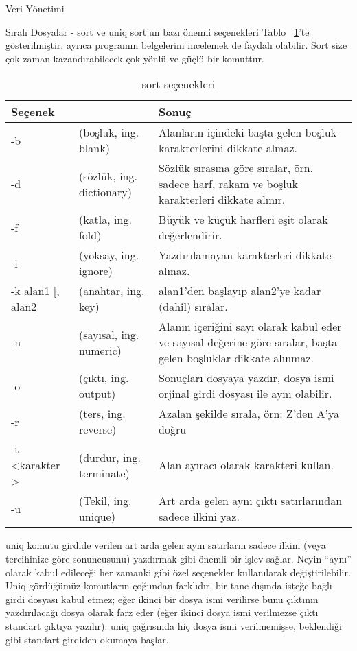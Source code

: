 \begin{section}{Veri Yönetimi}
\begin{subsection}{Sıralı Dosyalar - sort ve uniq}
sort'un bazı önemli seçenekleri Tablo ~\ref{tab:8.3}'te gösterilmiştir, ayrıca programın belgelerini incelemek de faydalı olabilir. Sort size çok zaman kazandırabilecek çok yönlü ve güçlü bir komuttur.

\footnotesize
\begin {table}[Htb]
\caption {sort seçenekleri} \label{tab:8.3}
\begin{tabular}{p{2cm} p{3cm} p{6cm}}
\hline
Seçenek & & Sonuç\\
\hline
-b & (boşluk, ing. blank) & Alanların içindeki başta gelen boşluk karakterlerini dikkate almaz.\\
-d & (sözlük, ing. dictionary) & Sözlük sırasına göre sıralar, örn. sadece harf, rakam ve boşluk karakterleri dikkate alınır.\\
-f & (katla, ing. fold) & Büyük ve küçük harfleri eşit olarak değerlendirir.\\
-i & (yoksay, ing. ignore) & Yazdırılamayan karakterleri dikkate almaz.\\
-k alan1 [, alan2] & (anahtar, ing. key) & alan1'den başlayıp alan2'ye kadar (dahil) sıralar.\\
-n & (sayısal, ing. numeric) & Alanın içeriğini sayı olarak kabul eder ve sayısal değerine göre sıralar, başta gelen boşluklar dikkate alınmaz.\\
-o & (çıktı, ing. output) & Sonuçları dosyaya yazdır, dosya ismi orjinal girdi dosyası ile aynı olabilir.\\
-r & (ters, ing. reverse) & Azalan şekilde sırala, örn: Z'den A'ya doğru\\
-t \textless karakter \textgreater & (durdur, ing. terminate) & Alan ayıracı olarak karakteri kullan.\\
-u & (Tekil, ing. unique) & Art arda gelen aynı çıktı satırlarından sadece ilkini yaz.\\
\hline
\end{tabular}
\end {table}
\normalsize

uniq komutu girdide verilen art arda gelen aynı satırların sadece ilkini (veya tercihinize göre sonuncusunu) yazdırmak gibi önemli bir işlev sağlar. Neyin “aynı” olarak kabul edileceği her zamanki gibi özel seçenekler kullanılarak değiştirilebilir. Uniq gördüğümüz komutların çoğundan farklıdır, bir tane dışında isteğe bağlı girdi dosyası kabul etmez; eğer ikinci bir dosya ismi verilirse bunu çıktının yazdırılacağı dosya olarak farz eder (eğer ikinci dosya ismi verilmezse çıktı standart çıktıya yazılır). uniq çağrısında hiç dosya ismi verilmemişse, beklendiği gibi standart girdiden okumaya başlar.


\end{subsection}
\end{section}
